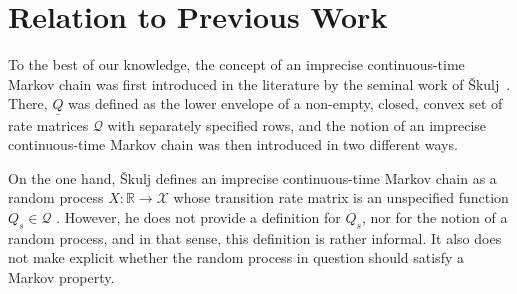 \documentclass[10pt,a4paper]{paper}
\theoremstyle{definition}
\newcommand{\reals}{\mathbb{R}}
\newcommand{\states}{\mathcal{X}}
\newcommand{\gambles}{\mathcal{L}}
\newcommand{\rateset}{\mathcal{Q}}
\newcommand{\lrate}{\underline{Q}}
\newcommand{\norm}[1]{\left\lVert #1 \right\rVert}
\begin{document}
%
%
%




\section{Relation to Previous Work}\label{sec:prev_work}


To the best of our knowledge, the concept of an imprecise continuous-time Markov chain was first introduced in the literature by the seminal work of {\v{S}}kulj~\cite{Skulj:2015cq}. There, $\lrate$ was defined as the lower envelope of a non-empty, closed, convex set of rate matrices $\rateset$ with separately specified rows, and the notion of an imprecise continuous-time Markov chain was then introduced in two different ways.

On the one hand, {\v{S}kulj}  defines an imprecise continuous-time Markov chain as a random process $X\colon\reals\to\states$ whose transition rate matrix is an unspecified function $Q_s\in\rateset$ \cite[Definition~1]{Skulj:2015cq}. 
However, he does not provide a definition for $Q_s$, nor for the notion of a random process, and in that sense, this definition is rather informal. It also does not make explicit whether the random process in question should satisfy a Markov property.%
\end{document}
